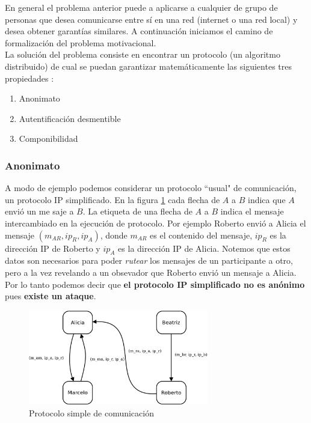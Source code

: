En general el problema anterior puede a aplicarse a cualquier de grupo de personas que
desea comunicarse entre sí en una red (internet o una red local) y desea obtener garantías
similares. A continuación iniciamos el camino de formalización del problema motivacional.\\
La solución del problema consiste en encontrar un protocolo (un algoritmo distribuido) de cual
se puedan garantizar matemáticamente las siguientes tres propiedades :
\begin{enumerate}
    \item Anonimato
    \item Autentificación desmentible
    \item Componibilidad
\end{enumerate}

\subsubsection{Anonimato}
A modo de ejemplo podemos considerar un protocolo ``usual" de comunicación, un protocolo IP simplificado.
En la figura \ref{tcpip_simple} cada flecha de $A$ a $B$ indica que $A$ envió un me saje a
$B$. La etiqueta de una flecha de $A$ a $B$ indica el mensaje intercambiado en la ejecución de protocolo.
Por ejemplo Roberto envió a Alicia el mensaje $(m_{AR}, ip_R, ip_A)$, donde $m_{AR}$ es el contenido
del mensaje, $ip_R$ es la dirección IP de Roberto y $ip_A$ es la dirección IP de Alicia. Notemos que estos
datos son necesarios para poder \textit{rutear} los mensajes de un participante a otro, pero a la vez 
revelando a un obsevador que Roberto envió un mensaje a Alicia. Por lo tanto podemos decir que
\textbf{el protocolo IP simplificado no es anónimo} pues \textbf{existe un ataque}.\\

\begin{figure}[hp]
    \centering
    \includegraphics[width=0.7\textwidth]{figs/tcpip_simple}
    \caption{Protocolo simple de comunicación}
    \label{tcpip_simple}
\end{figure}

